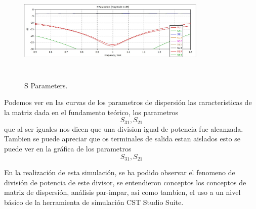 \documentclass[a4paper]{IEEEtran} %
\begin{document}
\begin{figure}[h]    
    \centering
    \includegraphics[width=9cm,height=5cm]{imagenes/img18}
    \caption{S Parameters.}
    \label{fig:parametro_s}
\end{figure}

Podemos ver en las curvas de los parametros de dispersión las caracteristicas de la matriz dada en el fundamento teórico, los parametros $$S_{31},S_{21}$$ que al ser iguales nos dicen que una division igual de potencia fue alcanzada.
Tambien se puede apreciar que os terminales de salida estan aislados esto se puede ver en la gráfica de los parametros $$S_{31},S_{21}$$ 

En la realización de esta simulación, se ha podido observar el fenomeno de división de potencia de este divisor, se entendieron conceptos los conceptos de matriz de dispersión, análisis par-impar, asi como tambien, el uso a un nivel básico de la herramienta de simulación CST Studio Suite.


\end{document}
